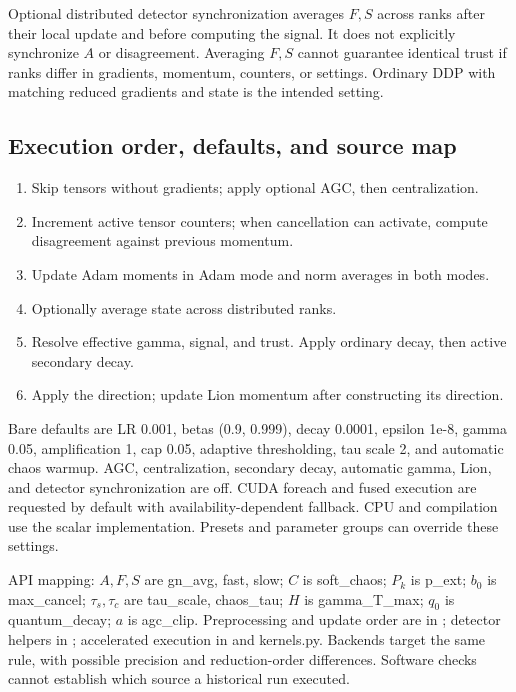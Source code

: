 \documentclass[11pt,a4paper]{article}
\theoremstyle{definition}
\theoremstyle{remark}
\begin{document}
Optional distributed detector synchronization averages $F,S$ across ranks after their local update and before computing the signal. It does not explicitly synchronize $A$ or disagreement. Averaging $F,S$ cannot guarantee identical trust if ranks differ in gradients, momentum, counters, or settings. Ordinary DDP with matching reduced gradients and state is the intended setting.

\subsection{Execution order, defaults, and source map}

\begin{enumerate}[itemsep=2pt]
\item Skip tensors without gradients; apply optional AGC, then centralization.
\item Increment active tensor counters; when cancellation can activate, compute disagreement against previous momentum.
\item Update Adam moments in Adam mode and norm averages in both modes.
\item Optionally average  state across distributed ranks.
\item Resolve effective gamma, signal, and trust. Apply ordinary decay, then active secondary decay.
\item Apply the direction; update Lion momentum after constructing its direction.
\end{enumerate}

Bare defaults are LR 0.001, betas (0.9, 0.999), decay 0.0001, epsilon 1e-8, gamma 0.05, amplification 1, cap 0.05, adaptive thresholding, tau scale 2, and automatic chaos warmup. AGC, centralization, secondary decay, automatic gamma, Lion, and detector synchronization are off. CUDA foreach and fused execution are requested by default with availability-dependent fallback. CPU and compilation use the scalar implementation. Presets and parameter groups can override these settings.

API mapping: $A,F,S$ are gn\_avg, fast, slow; $C$ is soft\_chaos; $P_k$ is p\_ext; $b_0$ is max\_cancel; $\tau_s,\tau_c$ are tau\_scale, chaos\_tau; $H$ is gamma\_T\_max; $q_0$ is quantum\_decay; $a$ is agc\_clip. Preprocessing and update order are in ; detector helpers in ; accelerated execution in  and kernels.py. Backends target the same rule, with possible precision and reduction-order differences. Software checks cannot establish which source a historical run executed.
\end{document}
